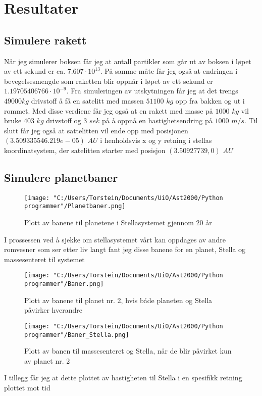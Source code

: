 \documentclass[11pt, A4paper, norsk]{report}
\begin{document}
	\section{Resultater}
		\subsection{Simulere rakett}
Når jeg simulerer boksen får jeg at antall partikler som går ut av boksen i løpet av ett sekund er ca. $7.607 \cdot 10^{13}$. På samme måte får jeg også at endringen i bevegelsesmengde som raketten blir oppnår i løpet av ett sekund er $1.19705406766 \cdot 10^{-9}$.
Fra simuleringen av utskytningen får jeg at det trengs $49000 kg$ drivstoff å få en satelitt med massen $51100$ $kg$ opp fra bakken og ut i rommet.
Med disse verdiene får jeg også at en rakett med masse på $1000$ $kg$ vil bruke $403$ $kg$ drivstoff og $3$ $sek$ på å oppnå en hastighetsendring på $1000$ $m/s$.
Til slutt får jeg også at sattelitten vil ende opp med posisjonen $(3.50933554 6.219e-05)$ $AU$ i henholdsvis x og y retning i stellas koordinatsystem, der satelitten starter med posisjon $(3.50927739, 0)$ $AU$ 

		\subsection{Simulere planetbaner}
\begin{figure}[H]
\texttt{[image: "C:/Users/Torstein/Documents/UiO/Ast2000/Python programmer"/Planetbaner.png]}
\caption{Plott av banene til planetene i Stellasystemet gjennom 20 år}
\end{figure}

I prossessen ved å sjekke om stellasystemet vårt kan oppdages av andre romvesner som ser etter liv langt fant jeg disse banene for en planet, Stella og massesenteret til systemet

\begin{figure}[H]
\texttt{[image: "C:/Users/Torstein/Documents/UiO/Ast2000/Python programmer"/Baner.png]}
\caption{Plott av banene til planet nr. 2, hvis både planeten og Stella påvirker hverandre}
\texttt{[image: "C:/Users/Torstein/Documents/UiO/Ast2000/Python programmer"/Baner\_Stella.png]}
\caption{Plott av banen til massesenteret og Stella, når de blir påvirket kun av planet nr. 2}
\end{figure}

I tillegg får jeg at dette plottet av hastigheten til Stella i en spesifikk retning plottet mot tid
\end{document}
